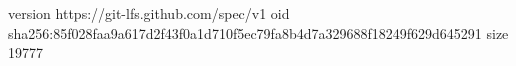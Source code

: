 version https://git-lfs.github.com/spec/v1
oid sha256:85f028faa9a617d2f43f0a1d710f5ec79fa8b4d7a329688f18249f629d645291
size 19777
